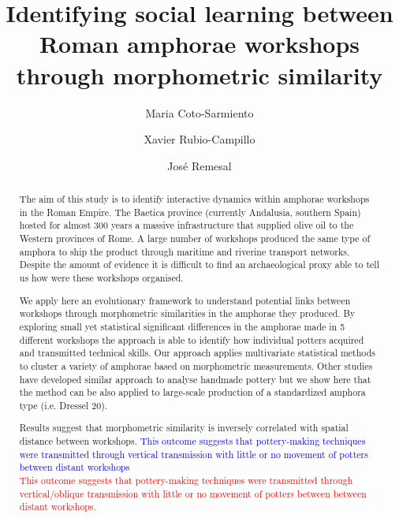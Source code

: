\documentclass[review]{elsarticle}
\newcommand{\memo}[2]{\textcolor{#1}{#2}}
\newcommand{\maria}[1]{\memo{red}{#1\\}}
\newcommand{\revise}[1]{\memo{blue}{#1\\}}
\begin{document}
\begin{frontmatter}

\title{Identifying social learning between Roman amphorae workshops through morphometric similarity}


\author[bscadress]{Maria Coto-Sarmiento}


\author[edadress]{Xavier Rubio-Campillo}
\author[ceipacadress]{Jos\'e Remesal}


\address[bscadress]{Barcelona Supercomputing Center (BSC), Jordi Girona 29, Office 3A, Nexus II Building, 08034, Barcelona, Spain}
\address[edadress]{School of History, Classic \& Archaeology, Room OOM.33, William Robertson Wing, Old Medical School, Teviot Place, University of Edinburgh, UK}
\address[ceipacadress]{CEIPAC, Department of Prehistory and Archaeology, Montalegre, 6-8, 08001, University of Barcelona, Barcelona, Spain}

\begin{abstract}

The aim of this study is to identify interactive dynamics within amphorae workshops in the Roman Empire. The Baetica province (currently Andalusia, southern Spain) hosted for almost 300 years a massive infrastructure that supplied olive oil to the Western provinces of Rome. A large number of workshops produced the same type of amphora to ship the product through maritime and riverine transport networks. Despite the amount of evidence it is difficult to find an archaeological proxy able to tell us how were these workshops organised.

We apply here an evolutionary framework to understand potential links between workshops through morphometric similarities in the amphorae they produced. By exploring small yet statistical significant differences in the amphorae made in 5 different workshops the approach is able to identify how individual potters acquired and transmitted technical skills.  Our approach applies multivariate statistical methods to cluster a variety of amphorae based on morphometric measurements. Other studies have developed similar approach to analyse handmade pottery but we show here that the method can be also applied to large-scale production of a standardized amphora type (i.e. Dressel 20).

Results suggest that morphometric similarity is inversely correlated with spatial distance between workshops. 
\revise{This outcome suggests that pottery-making techniques were transmitted through vertical transmission with little or no movement of potters between distant workshops}
\maria{This outcome suggests that pottery-making techniques were transmitted through vertical/oblique transmission with little or no movement of potters between between distant workshops.}


\end{abstract}
\end{frontmatter}
\end{document}
